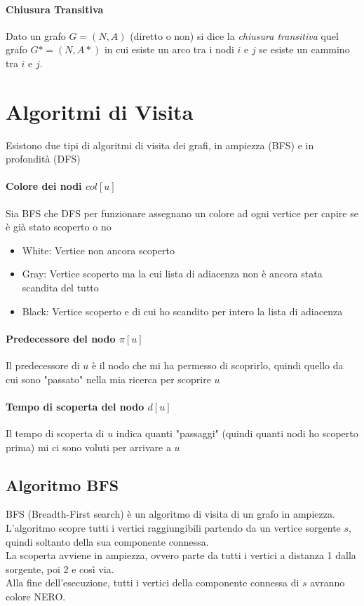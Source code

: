 \paragraph{Chiusura Transitiva}
Dato un grafo $G=(N,A)$ (diretto o non) si dice la \emph{chiusura transitiva} quel grafo $G*=(N,A*)$ in cui esiste un arco tra i nodi $i$ e $j$ se esiste un cammino tra $i$ e $j$.
\section{Algoritmi di Visita}
Esistono due tipi di algoritmi di visita dei grafi, in ampiezza (BFS) e in profondità (DFS)

\paragraph{Colore dei nodi $col[u]$}
Sia BFS che DFS per funzionare assegnano un colore ad ogni vertice per capire se è già stato scoperto o no
\begin{itemize}
	\item White: Vertice non ancora scoperto
	\item Gray: Vertice scoperto ma la cui lista di adiacenza non è ancora stata scandita del tutto
	\item Black: Vertice scoperto e di cui ho scandito per intero la lista di adiacenza
\end{itemize}
\paragraph{Predecessore del nodo $\pi[u]$}
Il predecessore di $u$ è il nodo che mi ha permesso di scoprirlo, quindi quello da cui sono "passato" nella mia ricerca per scoprire $u$
\paragraph{Tempo di scoperta del nodo $d[u]$}
Il tempo di scoperta di $u$ indica quanti "passaggi" (quindi quanti nodi ho scoperto prima) mi ci sono voluti per arrivare a $u$

\subsection{Algoritmo BFS}
BFS (Breadth-First search) è un algoritmo di visita di un grafo in ampiezza.
\\L'algoritmo scopre tutti i vertici raggiungibili partendo da un vertice sorgente $s$, quindi soltanto della sua componente connessa.
\\La scoperta avviene in ampiezza, ovvero parte da tutti i vertici a distanza 1 dalla sorgente, poi 2 e così via.
\\Alla fine dell'esecuzione, tutti i vertici della componente connessa di $s$ avranno colore NERO.

